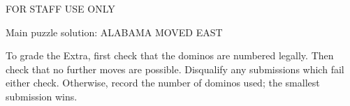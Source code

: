 \begin{puzzleSolutions}
FOR STAFF USE ONLY

Main puzzle solution: ALABAMA MOVED EAST

To grade the Extra,
first check that the dominos are numbered legally. Then check
that no further moves are possible. Disqualify any submissions which fail
either check. Otherwise, record the number of dominos used; the smallest
submission wins.
\end{puzzleSolutions}
